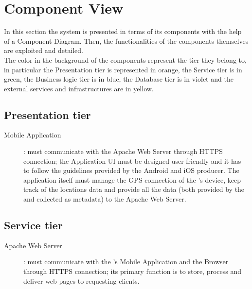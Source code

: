 \documentclass[../../DD.tex]{subfiles}
\begin{document}
\section{Component View\label{sect:2.2}}
 In this section the system is presented in terms of its components with the help of a Component Diagram. Then, the functionalities of the components themselves are exploited and detailed.\\
 
The color in the background of the components represent the tier they belong to, in particular the Presentation tier is represented in orange, the Service tier is in green, the Business logic tier is in blue, the Database tier is in violet and the external services and infrastructures are in yellow.

	
\subsection{Presentation tier\label{sect:2.2.1}}
	\begin{description}
	\item[Mobile Application]: must communicate with the Apache Web Server through HTTPS connection; the Application UI must be designed user friendly and it has to follow the guidelines provided by the Android and iOS producer. The application itself must manage the GPS connection of the 's device, keep track of the locations data and provide all the data (both provided by the  and collected as metadata) to the Apache Web Server.
	\end{description}
	
\subsection{Service tier\label{sect:2.2.2}}
	\begin{description}
	\item[Apache Web Server]: must communicate with the 's Mobile Application and the  Browser through HTTPS connection; its primary function is to store, process and deliver web pages to requesting clients.
	\end{description}
	
\end{document}
